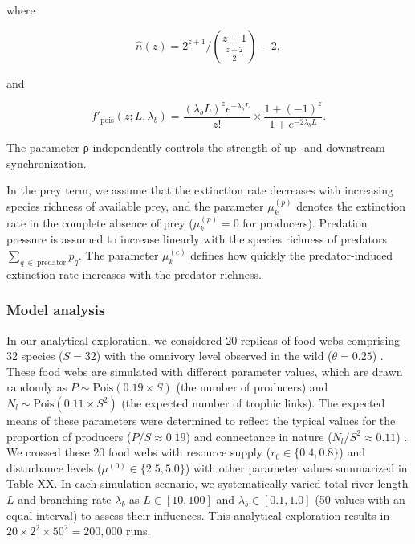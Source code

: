 \documentclass[11pt, class=article, crop=false]{standalone}
\begin{document}
where

\begin{equation}
    \hat{n}(z) = 2^{z + 1} / \binom{z + 1}{\frac{z + 2}{2}} - 2,
\end{equation}

and

\begin{equation}
    f'_{\text{pois}}(z; L, \lambda_b) = \frac{(\lambda_b L)^z e^{-\lambda_b L}}{z!} \times \frac{1 + (-1)^{z}}{1 + e^{-2\lambda_b L}}.
\end{equation}

The parameter ρ independently controls the strength of up- and downstream synchronization.

In the prey term, we assume that the extinction rate decreases with increasing species richness of available prey, and the parameter $\mu_{k}^{(p)}$ denotes the extinction rate in the complete absence of prey ($\mu_{k}^{(p)} = 0$ for producers).
Predation pressure is assumed to increase linearly with the species richness of predators $\sum_{q~\in~\text{predator}} p_{q}$.
The parameter $\mu_{k}^{(c)}$ defines how quickly the predator-induced extinction rate increases with the predator richness.

\subsubsection{Model analysis}

In our analytical exploration, we considered 20 replicas of food webs comprising 32 species ($S = 32$) with the omnivory level observed in the wild ($\theta = 0.25$) \cite{johnson_trophic_2014}.
These food webs are simulated with different parameter values, which are drawn randomly as $P \sim \mbox{Pois}(0.19 \times S)$ (the number of producers) and $N_l \sim \mbox{Pois}(0.11 \times S^2)$ (the expected number of trophic links).
The expected means of these parameters were determined to reflect the typical values for the proportion of producers ($P / S \approx 0.19$) \citep{briand_community_1984} and connectance in nature ($N_l / S^2 \approx 0.11$) \citep{dunne_food-web_2002}.
We crossed these 20 food webs with resource supply ($r_0 \in \{0.4, 0.8\}$) and disturbance levels ($\mu^{(0)} \in \{2.5, 5.0\}$) with other parameter values summarized in Table XX.
In each simulation scenario, we systematically varied total river length $L$ and branching rate $\lambda_b$ as $L \in [10, 100]$ and $\lambda_b \in [0.1, 1.0]$ (50 values with an equal interval) to assess their influences.
This analytical exploration results in $20 \times 2^2 \times 50^2 = 200,000$ runs.
\end{document}
